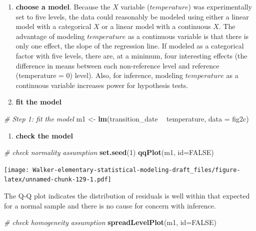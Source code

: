 \documentclass[]{book}
\newenvironment{Shaded}{\begin{snugshade}}{\end{snugshade}}
\newcommand{\CommentTok}[1]{\textcolor[rgb]{0.56,0.35,0.01}{\textit{#1}}}
\newcommand{\DataTypeTok}[1]{\textcolor[rgb]{0.13,0.29,0.53}{#1}}
\newcommand{\DecValTok}[1]{\textcolor[rgb]{0.00,0.00,0.81}{#1}}
\newcommand{\KeywordTok}[1]{\textcolor[rgb]{0.13,0.29,0.53}{\textbf{#1}}}
\newcommand{\NormalTok}[1]{#1}
\newcommand{\OperatorTok}[1]{\textcolor[rgb]{0.81,0.36,0.00}{\textbf{#1}}}
\newcommand{\OtherTok}[1]{\textcolor[rgb]{0.56,0.35,0.01}{#1}}
\newcommand{\StringTok}[1]{\textcolor[rgb]{0.31,0.60,0.02}{#1}}
\providecommand{\tightlist}{%
  \setlength{\itemsep}{0pt}\setlength{\parskip}{0pt}}
\begin{document}
\begin{enumerate}
\def\labelenumi{\arabic{enumi}.}
\setcounter{enumi}{1}
\item
  \textbf{choose a model}. Because the \(X\) variable (\(temperature\)) was experimentally set to five levels, the data could reasonably be modeled using either a linear model with a categorical \(X\) or a linear model with a continuous \(X\). The advantage of modeling \(temperature\) as a continuous variable is that there is only one effect, the slope of the regression line. If modeled as a categorical factor with five levels, there are, at a minimum, four interesting effects (the difference in means between each non-reference level and reference (temperature = 0) level). Also, for inference, modeling \(temperature\) as a continuous variable increases power for hypothesis tests.
\item
  \textbf{fit the model}
\end{enumerate}

\begin{Shaded}
\begin{Highlighting}[]
\CommentTok{# Step 1: fit the model}
\NormalTok{m1 <-}\StringTok{ }\KeywordTok{lm}\NormalTok{(transition_date }\OperatorTok{~}\StringTok{ }\NormalTok{temperature, }\DataTypeTok{data =}\NormalTok{ fig2c)}
\end{Highlighting}
\end{Shaded}

\begin{enumerate}
\def\labelenumi{\arabic{enumi}.}
\setcounter{enumi}{3}
\tightlist
\item
  \textbf{check the model}
\end{enumerate}

\begin{Shaded}
\begin{Highlighting}[]
\CommentTok{# check normality assumption}
\KeywordTok{set.seed}\NormalTok{(}\DecValTok{1}\NormalTok{)}
\KeywordTok{qqPlot}\NormalTok{(m1, }\DataTypeTok{id=}\OtherTok{FALSE}\NormalTok{)}
\end{Highlighting}
\end{Shaded}

\texttt{[image: Walker-elementary-statistical-modeling-draft\_files/figure-latex/unnamed-chunk-129-1.pdf]}

The Q-Q plot indicates the distribution of residuals is well within that expected for a normal sample and there is no cause for concern with inference.

\begin{Shaded}
\begin{Highlighting}[]
\CommentTok{# check homogeneity assumption}
\KeywordTok{spreadLevelPlot}\NormalTok{(m1, }\DataTypeTok{id=}\OtherTok{FALSE}\NormalTok{)}
\end{Highlighting}
\end{Shaded}
\end{document}
